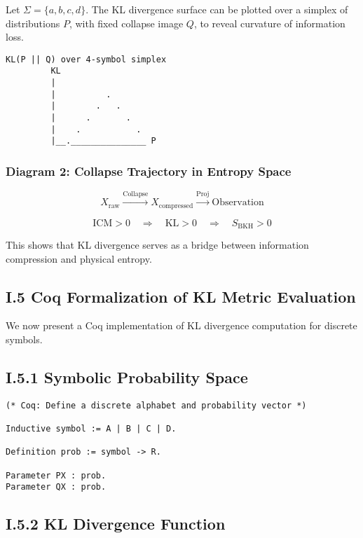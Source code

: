 \documentclass[11pt]{article}
\begin{document}
Let \( \Sigma = \{a, b, c, d\} \). The KL divergence surface can be plotted over a simplex of distributions \( P \), with fixed collapse image \( Q \), to reveal curvature of information loss.

\begin{lstlisting}
KL(P || Q) over 4-symbol simplex
         KL
         |
         |          .
         |        .   .
         |      .       .
         |    .           .
         |__._______________ P
\end{lstlisting}

\subsubsection*{Diagram 2: Collapse Trajectory in Entropy Space}

\[
X_{\text{raw}} \xrightarrow{\mathrm{Collapse}} X_{\text{compressed}} \xrightarrow{\mathrm{Proj}} \text{Observation}
\]

\[
\text{ICM} > 0 \quad \Rightarrow \quad \mathrm{KL} > 0 \quad \Rightarrow \quad S_{\mathrm{BKH}} > 0
\]

This shows that KL divergence serves as a bridge between information compression and physical entropy.

\subsection*{I.5 Coq Formalization of KL Metric Evaluation}

We now present a Coq implementation of KL divergence computation for discrete symbols.

\subsection*{I.5.1 Symbolic Probability Space}

\begin{lstlisting}
(* Coq: Define a discrete alphabet and probability vector *)

Inductive symbol := A | B | C | D.

Definition prob := symbol -> R.

Parameter PX : prob.
Parameter QX : prob.
\end{lstlisting}

\subsection*{I.5.2 KL Divergence Function}
\end{document}
